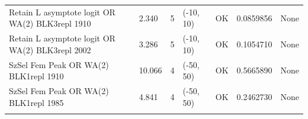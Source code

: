 \documentclass[11pt,
  english,
  a4paper,
]{article}
\begin{document}
\begin{landscape}
\begin{longtable}[t]{>{\raggedright\arraybackslash}p{7cm}lllll>{\raggedright\arraybackslash}p{4cm}}
Retain L asymptote logit OR WA(2) BLK3repl 1910 & 2.340 & 5 & (-10, 10) & OK & 0.0859856 & None\\
Retain L asymptote logit OR WA(2) BLK3repl 2002 & 3.286 & 5 & (-10, 10) & OK & 0.1054710 & None\\
SzSel Fem Peak OR WA(2) BLK1repl 1910 & 10.066 & 4 & (-50, 50) & OK & 0.5665890 & None\\
SzSel Fem Peak OR WA(2) BLK1repl 1985 & 4.841 & 4 & (-50, 50) & OK & 0.2462730 & None\\*
\end{longtable}
\leavevmode\tagmcend\tagstructend\par
\endgroup{}
\end{landscape}
\endgroup{}







\newpage

\begingroup\fontsize{10}{12}\selectfont
\begingroup\fontsize{10}{12}\selectfont
\end{document}
